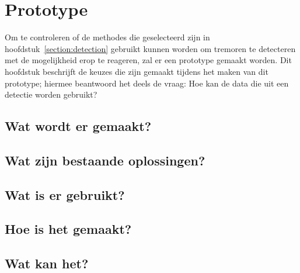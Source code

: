 \section{Prototype}
\label{section:prototyping}

Om te controleren of de methodes die geselecteerd zijn in hoofdstuk~\ref{section:detection}
gebruikt kunnen worden om tremoren te detecteren met de mogelijkheid erop te reageren,
zal er een prototype gemaakt worden.
Dit hoofdstuk beschrijft de keuzes die zijn gemaakt tijdens het maken van dit prototype;
hiermee beantwoord het deels de vraag: Hoe kan de data die uit een detectie worden gebruikt?

\subsection{Wat wordt er gemaakt?}

\subsection{Wat zijn bestaande oplossingen?}

\subsection{Wat is er gebruikt?}

\subsection{Hoe is het gemaakt?}

\subsection{Wat kan het?}